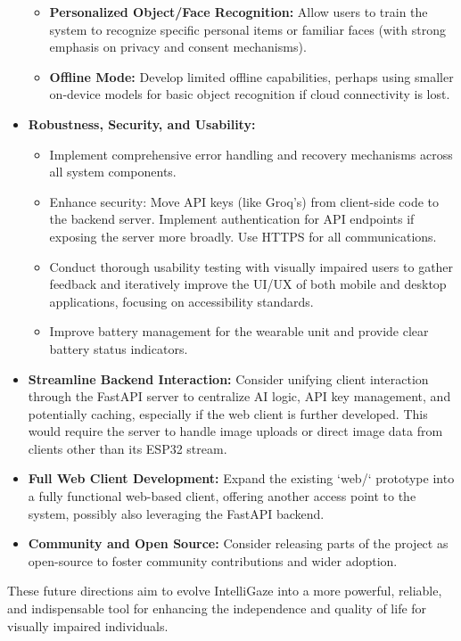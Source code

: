 \documentclass[12pt, a4paper]{report}
\begin{document}
\begin{itemize}
\begin{itemize}
            \item \textbf{Personalized Object/Face Recognition:} Allow users to train the system to recognize specific personal items or familiar faces (with strong emphasis on privacy and consent mechanisms).
            \item \textbf{Offline Mode:} Develop limited offline capabilities, perhaps using smaller on-device models for basic object recognition if cloud connectivity is lost.
        \end{itemize}
    \item \textbf{Robustness, Security, and Usability:}
        \begin{itemize}
            \item Implement comprehensive error handling and recovery mechanisms across all system components.
            \item Enhance security: Move API keys (like Groq's) from client-side code to the backend server. Implement authentication for API endpoints if exposing the server more broadly. Use HTTPS for all communications.
            \item Conduct thorough usability testing with visually impaired users to gather feedback and iteratively improve the UI/UX of both mobile and desktop applications, focusing on accessibility standards.
            \item Improve battery management for the wearable unit and provide clear battery status indicators.
        \end{itemize}
    \item \textbf{Streamline Backend Interaction:} Consider unifying client interaction through the FastAPI server to centralize AI logic, API key management, and potentially caching, especially if the web client is further developed. This would require the server to handle image uploads or direct image data from clients other than its ESP32 stream.
    \item \textbf{Full Web Client Development:} Expand the existing `web/` prototype into a fully functional web-based client, offering another access point to the system, possibly also leveraging the FastAPI backend.
    \item \textbf{Community and Open Source:} Consider releasing parts of the project as open-source to foster community contributions and wider adoption.
\end{itemize}
These future directions aim to evolve IntelliGaze into a more powerful, reliable, and indispensable tool for enhancing the independence and quality of life for visually impaired individuals.
\end{document}
